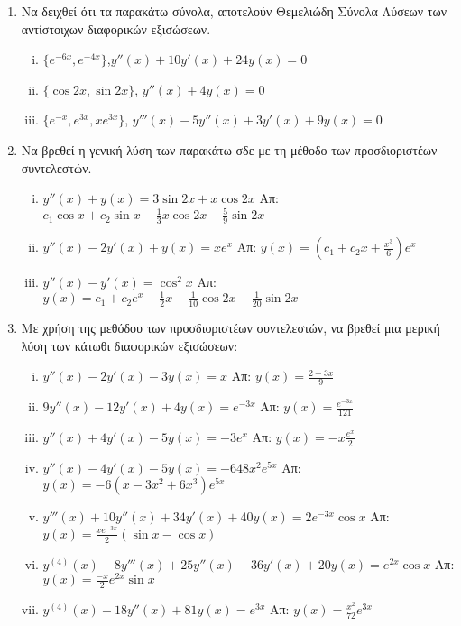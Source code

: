 



\pagestyle{askhseis}
\everymath{\displaystyle}




\begin{center}
  \minibox{\large\bfseries \textcolor{Col1}{Ασκήσεις ΣΔΕ 2ης ταξης}}
\end{center}

\vspace{\baselineskip}

\begin{enumerate}
  \item Να δειχθεί ότι τα  παρακάτω σύνολα, αποτελούν Θεμελιώδη Σύνολα Λύσεων των 
    αντίστοιχων διαφορικών εξισώσεων.
    \begin{enumerate}[i)]
      \item $ \{ e^{-6x}, e^{-4x} \} $,\quad $ y''(x)+10y'(x)+24y(x)=0 $ 
      \item $ \{ \cos{2x}, \sin{2x} \}$, \quad $ y''(x)+4y(x)=0 $
      \item $ \{ e^{-x}, e^{3x}, xe^{3x} \} $, \quad $ y'''(x)-5y''(x)+3y'(x)+9y(x)=0 $
    \end{enumerate}

  \item Να βρεθεί η γενική λύση των παρακάτω σδε με τη μέθοδο των προσδιοριστέων 
    συντελεστών.
    \begin{enumerate}[i)]
      \item $y''(x)+y(x)=3\sin 2x + x\cos 2x$ 
        \hfill Απ: $c_{1}\cos x+c_{2}\sin x-\frac{1}{3}x\cos 2x-\frac{5}{9}\sin 2x $
      \item $y''(x)-2y'(x)+y(x)=xe^{x}$ 
        \hfill Απ:  $y(x)=(c_{1}+c_{2}x+\frac{x^{3}}{6})e^{x}$
      \item $y''(x)-y'(x)=\cos^{2}x$ 
        \hfill Απ: $y(x) =c_{1}+c_{2}e^{x}-\frac{1}{2}x-\frac{1}{10}\cos 2x- 
        \frac{1}{20}\sin 2x$
    \end{enumerate}

  \item Με χρήση της μεθόδου των προσδιοριστέων συντελεστών, να βρεθεί μια μερική 
    λύση των κάτωθι διαφορικών εξισώσεων:
    \begin{enumerate}[i)]
      \item $y''(x)-2y'(x)-3y(x)=x$ \hfill Απ: $y(x)=\frac{2-3x}{9}$
      \item $9y''(x)-12y'(x)+4y(x)=e^{-3x}$ \hfill Απ: $y(x)=\frac{e^{-3x}}{121}$
      \item $y''(x)+4y'(x)-5y(x)=-3e^{x}$ \hfill Απ: $y(x)=-x\frac{e^{x}}{2}$
      \item $y''(x)-4y'(x)-5y(x)=-648x^{2}e^{5x}$ 
        \hfill Απ: $ y(x)=-6(x-3x^{2}+6x^{3})e^{5x}$
      \item $y'''(x)+10y''(x)+34y'(x)+40y(x)=2e^{-3x}\cos x$ 
        \hfill Απ: $y(x)= \frac{xe^{-3x}}{2}(\sin x - \cos x)$
      \item $y^{(4)}(x)-8y'''(x)+25y''(x)-36y'(x)+20y(x)=e^{2x}\cos x$ 
        \hfill Απ: $y(x) =\frac{-x}{2}e^{2x}\sin x$
      \item $y^{(4)}(x)-18y''(x)+81y(x)=e^{3x}$ \hfill Απ: $y(x)=\frac{x^{2}}{72}e^{3x}$
    \end{enumerate}


\end{enumerate}
